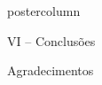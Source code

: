 \documentclass[final,hyperref={pdfpagelabels=false}]{beamer}
\begin{document}
\begin{frame}
\begin{columns}
\begin{column}{.54\textwidth}
\begin{beamercolorbox}[center,wd=\textwidth]{postercolumn}
\begin{minipage}[T]{.95\textwidth}
{						\begin{block}{\vspace*{-7pt} \large VI -- Conclusões}
						\end{block}	 
						\vspace*{14pt}
						
						\begin{block}{\vspace*{-7pt} \large Agradecimentos}
						\end{block}	
						\vspace*{14pt}
					}
				\end{minipage}
			\end{beamercolorbox}
		\end{column}
	\end{columns}
	\end{frame}
\end{document}
